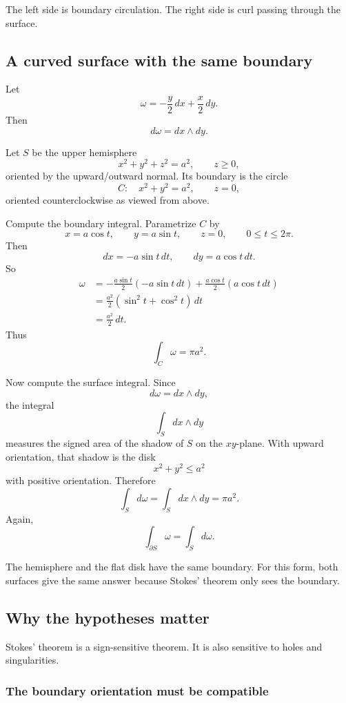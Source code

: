 The left side is boundary circulation.  The right side is curl passing through the
surface.

\subsection{A curved surface with the same boundary}

Let
\[
    \omega=-\frac y2\,dx+\frac x2\,dy.
\]
Then
\[
    d\omega=dx\wedge dy.
\]

Let \(S\) be the upper hemisphere
\[
    x^2+y^2+z^2=a^2,
    \qquad z\ge0,
\]
oriented by the upward/outward normal.  Its boundary is the circle
\[
    C:\quad x^2+y^2=a^2,\qquad z=0,
\]
oriented counterclockwise as viewed from above.

Compute the boundary integral.  Parametrize \(C\) by
\[
    x=a\cos t,\qquad y=a\sin t,\qquad z=0,
    \qquad 0\le t\le2\pi.
\]
Then
\[
    dx=-a\sin t\,dt,
    \qquad
    dy=a\cos t\,dt.
\]
So
\[
\begin{aligned}
    \omega
    &=
    -\frac{a\sin t}{2}(-a\sin t\,dt)
    +
    \frac{a\cos t}{2}(a\cos t\,dt)\\
    &=
    \frac{a^2}{2}(\sin^2 t+\cos^2 t)\,dt\\
    &=
    \frac{a^2}{2}\,dt.
\end{aligned}
\]
Thus
\[
\boxed{
    \int_C\omega=\pi a^2.
}
\]

Now compute the surface integral.  Since
\[
    d\omega=dx\wedge dy,
\]
the integral
\[
    \int_S dx\wedge dy
\]
measures the signed area of the shadow of \(S\) on the \(xy\)-plane.  With upward
orientation, that shadow is the disk
\[
    x^2+y^2\le a^2
\]
with positive orientation.  Therefore
\[
\boxed{
    \int_S d\omega=\int_S dx\wedge dy=\pi a^2.
}
\]
Again,
\[
\boxed{
    \int_{\partial S}\omega=\int_S d\omega.
}
\]

The hemisphere and the flat disk have the same boundary.  For this form, both surfaces
give the same answer because Stokes' theorem only sees the boundary.

\subsection{Why the hypotheses matter}

Stokes' theorem is a sign-sensitive theorem.  It is also sensitive to holes and
singularities.

\subsubsection*{The boundary orientation must be compatible}

